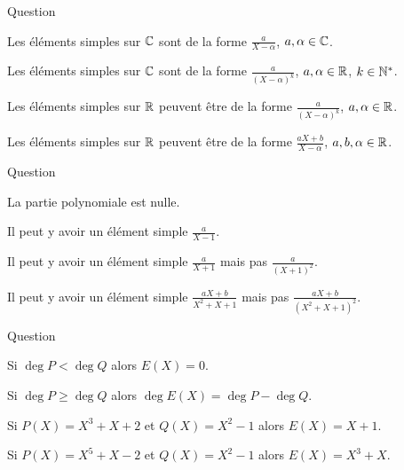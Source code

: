 \begin{multi}[multiple,feedback=
{Sur \(\Cc\) les éléments simples sont de la forme \(\frac{a}{(X-\alpha)^k}\), \(a,\alpha \in \Cc\), \(k\in\Nn^*\).
Sur \(\Rr\) les éléments simples sont de la forme \(\frac{a}{(X-\alpha)^k}\), \(a,\alpha \in \Rr\), \(k \in \Nn^*\) ou bien
\(\frac{aX+b}{(X^2+\alpha X+\beta)^k}\), \(a,b,\alpha,\beta \in \Rr\), \(k \in \Nn^*\) avec 
\(X^2+\alpha X+\beta\) sans racines réelles.
}]{Question}
    \item Les éléments simples sur \(\Cc\) sont de la forme \(\frac{a}{X-\alpha}\), \(a,\alpha \in \Cc\).
    \item Les éléments simples sur \(\Cc\) sont de la forme \(\frac{a}{(X-\alpha)^k}\), \(a,\alpha \in \Rr\), \(k\in\Nn^*\).
    \item* Les éléments simples sur \(\Rr\) peuvent être de la forme \(\frac{a}{(X-\alpha)^k}\), \(a,\alpha \in \Rr\).
    \item Les éléments simples sur \(\Rr\) peuvent être de la forme \(\frac{aX+b}{X-\alpha}\), \(a,b,\alpha \in \mathbb{R}\).
\end{multi}


\begin{multi}[multiple,feedback=
{\(\frac{P(X)}{Q(X)} = \frac{X-1}{(X+1)^2(X^2+X+1)}
= \frac{-1}{X+1}+\frac{-2}{(X+1)^2}+\frac{X+2}{X^2+X+1}\).
}]{Question}
    \item* La partie polynomiale est nulle.
    \item Il peut y avoir un élément simple \(\frac{a}{X-1}\).
    \item Il peut y avoir un élément simple \(\frac{a}{X+1}\) mais pas  \(\frac{a}{(X+1)^2}\).
    \item* Il peut y avoir un élément simple \(\frac{aX+b}{X^2+X+1}\) mais pas  \(\frac{aX+b}{(X^2+X+1)^2}\).
\end{multi}


\begin{multi}[multiple,feedback=
{La partie entière s'obtient comme le quotient de la division euclidienne de \(P\) par \(Q\).
}]{Question}
    \item* Si \(\deg P < \deg Q\) alors \(E(X) = 0\).
    \item* Si \(\deg P \ge \deg Q\) alors \(\deg E(X) = \deg P - \deg Q\).
    \item Si \(P(X) = X^3+X+2\) et \(Q(X) = X^2-1\) alors \(E(X) = X+1\).
    \item* Si \(P(X) = X^5+X-2\) et \(Q(X) = X^2-1\) alors \(E(X) = X^3+X\).
\end{multi}


